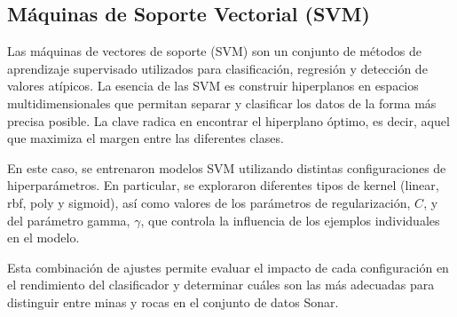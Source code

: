 \documentclass[a4paper,10pt]{article}
\begin{document}
    \newpage
    \subsection{Máquinas de Soporte Vectorial (SVM)}
    Las máquinas de vectores de soporte (SVM) son un conjunto de métodos de aprendizaje supervisado utilizados para clasificación, regresión y detección de valores atípicos. La esencia de las SVM es construir hiperplanos en espacios multidimensionales que permitan separar y clasificar los datos de la forma más precisa posible. La clave radica en encontrar el hiperplano óptimo, es decir, aquel que maximiza el margen entre las diferentes clases.
    
    En este caso, se entrenaron modelos SVM utilizando distintas configuraciones de hiperparámetros. En particular, se exploraron diferentes tipos de kernel (linear, rbf, poly y sigmoid), así como valores de los parámetros de regularización, $C$, y del parámetro gamma, $\gamma$, que controla la influencia de los ejemplos individuales en el modelo. 
    
    Esta combinación de ajustes permite evaluar el impacto de cada configuración en el rendimiento del clasificador y determinar cuáles son las más adecuadas para distinguir entre minas y rocas en el conjunto de datos Sonar.
    
\end{document}
